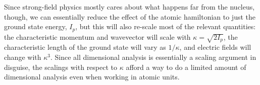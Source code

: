 Since strong-field physics mostly cares about what happens far from the nucleus, though, we can essentially reduce the effect of the atomic hamiltonian to just the ground state energy, $I_p$, but this will also re-scale most of the relevant quantities: the characteristic momentum and wavevector will scale with $\kappa=\sqrt{2I_p}$, the characteristic length of the ground state will vary as $1/\kappa$, and electric fields will change with $\kappa^3$. Since all dimensional analysis is essentially a scaling argument in disguise, the scalings with respect to $\kappa$ afford a way to do a limited amount of dimensional analysis even when working in atomic units.











